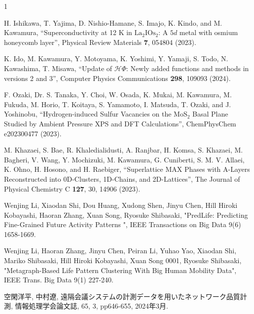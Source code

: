 \begin{雑誌論文}{1}


H. Ishikawa, T. Yajima, D. Nishio-Hamane, S. Imajo, K. Kindo, and M. Kawamura,
``Superconductivity at 12 K in ${\mathrm{La}}_{2}{\mathrm{IOs}}_{2}$: A $5d$ metal with osmium honeycomb layer'',
Physical Review Materials \textbf{7}, 054804 (2023).

K. Ido, M. Kawamura, Y. Motoyama, K. Yoshimi, Y. Yamaji, S. Todo, N. Kawashima, T. Misawa,
``Update of $\mathcal{H}\Phi$: Newly added functions and methods in versions 2 and 3'',
Computer Physics Communications \textbf{298}, 109093 (2024).

F. Ozaki, Dr. S. Tanaka, Y. Choi, W. Osada, K. Mukai, M. Kawamura, M. Fukuda, M. Horio, T. Koitaya, S. Yamamoto, I. Matsuda, T. Ozaki, and J. Yoshinobu,
``Hydrogen-induced Sulfur Vacancies on the $\mathrm{MoS}_2$ Basal Plane Studied by Ambient Pressure XPS and DFT Calculations'',
ChemPhysChem e202300477 (2023).

M. Khazaei, S. Bae, R. Khaledialidusti, A. Ranjbar, H. Komsa, S. Khazaei, M. Bagheri, V. Wang, Y. Mochizuki, M. Kawamura, G. Cuniberti, S. M. V. Allaei, K. Ohno, H. Hosono, and H. Raebiger, 
``Superlattice MAX Phases with A-Layers Reconstructed into 0D-Clusters, 1D-Chains, and 2D-Lattices'',
The Journal of Physical Chemistry C \textbf{127}, 30, 14906 (2023).

 Wenjing Li, Xiaodan Shi, Dou Huang, Xudong Shen, Jinyu Chen, Hill Hiroki Kobayashi, Haoran Zhang, Xuan Song, Ryosuke Shibasaki,  "PredLife: Predicting Fine-Grained Future Activity Patterns ", IEEE Transactions on Big Data 9(6) 1658-1669.

 Wenjing Li, Haoran Zhang, Jinyu Chen, Peiran Li, Yuhao Yao, Xiaodan Shi, Mariko Shibasaki, Hill Hiroki Kobayashi, Xuan Song 0001, Ryosuke Shibasaki,  "Metagraph-Based Life Pattern Clustering With Big Human Mobility Data", IEEE Trans. Big Data 9(1) 227-240.
 
空閑洋平, 中村遼, 遠隔会議システムの計測データを用いたネットワーク品質計測, 情報処理学会論文誌, 65, 3, pp646-655, 2024年3月.


\end{雑誌論文}
